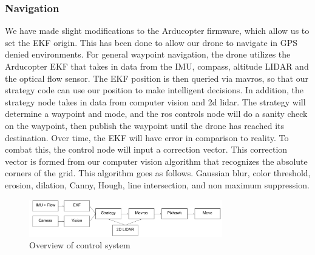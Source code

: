 \documentclass[12pt,letterpaper]{article}
\begin{document}
		\subsubsection*{Navigation}
			We have made slight modifications to the Arducopter firmware, which allow us to set the EKF origin. This has been done to allow our drone to navigate in GPS denied environments. For general waypoint navigation, the drone utilizes the Arducopter EKF that takes in data from the IMU, compass, altitude LIDAR and the optical flow sensor. The EKF position is then queried via mavros, so that our strategy code can use our position to make intelligent decisions. In addition, the strategy node takes in data from computer vision and 2d lidar. The strategy will determine a waypoint and mode, and the ros controls node will do a sanity check on the waypoint, then publish the waypoint until the drone has reached its destination. Over time, the EKF will have error in comparison to reality. To combat this, the control node will input a correction vector. This correction vector is formed from our computer vision algorithm that recognizes the absolute corners of the grid. This algorithm goes as follows. Gaussian blur, color threshold, erosion, dilation, Canny, Hough, line intersection, and non maximum suppression.

		\begin{figure}[!htbp]
		\begin{center}
		\includegraphics[width=0.75\textwidth]{system}
		\caption*{Overview of control system}
		\end{center}
		\end{figure}

\end{document}
